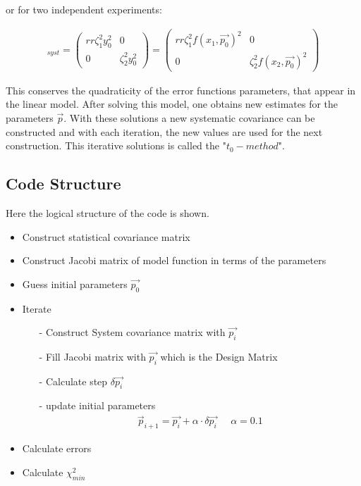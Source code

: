 \documentclass[a4paper]{article}
\begin{document}
or for two independent experiments:

\begin{align}
    [Cov(y_i,y_j)]_{syst}=\begin{pmatrix}{rr}
  \zeta_1^2y_0^2   & 0 \\
   0  & \zeta_2^2y_0^2
\end{pmatrix}=\begin{pmatrix}{rr}
  \zeta_1^2f(x_1,\Vec{p_0})^2   & 0 \\
  0   & \zeta_2^2f(x_2,\Vec{p_0})^2
\end{pmatrix}
\end{align}

This conserves the quadraticity of the error functions parameters, that appear
in the linear model. After solving this model, one obtains new estimates for
the parameters $\Vec{p}$. With these solutions a new systematic covariance can
be constructed and with each iteration, the new values are used for the next
construction. This iterative solutions is called the "$t_0-method$".
\subsection{Code Structure}
Here the logical structure of the code is shown.
\begin{itemize}[noitemsep]
    \item Construct statistical covariance matrix
    \item Construct Jacobi matrix of model function in terms of the parameters
    \item Guess initial parameters $\vec{p_0}$
    \item Iterate
        \begin{itemize}[noitemsep]
            \item[-] Construct System covariance matrix with $\vec{p_{i}}$
            \item[-] Fill Jacobi matrix with $\vec{p_{i}}$ which is the Design Matrix
            \item[-] Calculate step $\delta \vec{p_{i}}$
            \item[-] update initial parameters
                \begin{align*}
                    \vec{p}_{i+1} = \vec{p_{i}} + \alpha \cdot \delta \vec{p_{i}} \;\;\;\;\; \alpha = 0.1
                \end{align*}
        \end{itemize}
    \item Calculate errors
    \item Calculate $\chi^2_{min}$
\end{itemize}
\end{document}
